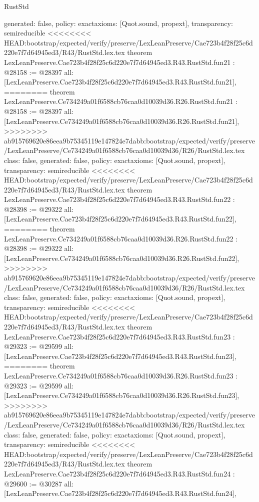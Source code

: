 \begin{lexlean}{RustStd}
\begin{coremodule}
{\begin{coremodule}
{{{{{{{{{{{{{{{{{{{{{{{{  generated: false,
  policy: exact{axioms: [Quot.sound, propext]},
  transparency: semireducible
}
<<<<<<<< HEAD:bootstrap/expected/verify/preserve/LexLeanPreserve/Cae723b4f28f25c6d220e7f7d64945ed3/R43/RustStd.lex.tex
theorem LexLeanPreserve.Cae723b4f28f25c6d220e7f7d64945ed3.R43.RustStd.fun21 : @28158 := @28397 {
  all: [LexLeanPreserve.Cae723b4f28f25c6d220e7f7d64945ed3.R43.RustStd.fun21],
========
theorem LexLeanPreserve.Ce734249a01f6588cb76caa0d10039d36.R26.RustStd.fun21 : @28158 := @28397 {
  all: [LexLeanPreserve.Ce734249a01f6588cb76caa0d10039d36.R26.RustStd.fun21],
>>>>>>>> ab915769620e86eea9b75345119e147824e7dabb:bootstrap/expected/verify/preserve/LexLeanPreserve/Ce734249a01f6588cb76caa0d10039d36/R26/RustStd.lex.tex
  class: false,
  generated: false,
  policy: exact{axioms: [Quot.sound, propext]},
  transparency: semireducible
}
<<<<<<<< HEAD:bootstrap/expected/verify/preserve/LexLeanPreserve/Cae723b4f28f25c6d220e7f7d64945ed3/R43/RustStd.lex.tex
theorem LexLeanPreserve.Cae723b4f28f25c6d220e7f7d64945ed3.R43.RustStd.fun22 : @28398 := @29322 {
  all: [LexLeanPreserve.Cae723b4f28f25c6d220e7f7d64945ed3.R43.RustStd.fun22],
========
theorem LexLeanPreserve.Ce734249a01f6588cb76caa0d10039d36.R26.RustStd.fun22 : @28398 := @29322 {
  all: [LexLeanPreserve.Ce734249a01f6588cb76caa0d10039d36.R26.RustStd.fun22],
>>>>>>>> ab915769620e86eea9b75345119e147824e7dabb:bootstrap/expected/verify/preserve/LexLeanPreserve/Ce734249a01f6588cb76caa0d10039d36/R26/RustStd.lex.tex
  class: false,
  generated: false,
  policy: exact{axioms: [Quot.sound, propext]},
  transparency: semireducible
}
<<<<<<<< HEAD:bootstrap/expected/verify/preserve/LexLeanPreserve/Cae723b4f28f25c6d220e7f7d64945ed3/R43/RustStd.lex.tex
theorem LexLeanPreserve.Cae723b4f28f25c6d220e7f7d64945ed3.R43.RustStd.fun23 : @29323 := @29599 {
  all: [LexLeanPreserve.Cae723b4f28f25c6d220e7f7d64945ed3.R43.RustStd.fun23],
========
theorem LexLeanPreserve.Ce734249a01f6588cb76caa0d10039d36.R26.RustStd.fun23 : @29323 := @29599 {
  all: [LexLeanPreserve.Ce734249a01f6588cb76caa0d10039d36.R26.RustStd.fun23],
>>>>>>>> ab915769620e86eea9b75345119e147824e7dabb:bootstrap/expected/verify/preserve/LexLeanPreserve/Ce734249a01f6588cb76caa0d10039d36/R26/RustStd.lex.tex
  class: false,
  generated: false,
  policy: exact{axioms: [Quot.sound, propext]},
  transparency: semireducible
}
<<<<<<<< HEAD:bootstrap/expected/verify/preserve/LexLeanPreserve/Cae723b4f28f25c6d220e7f7d64945ed3/R43/RustStd.lex.tex
theorem LexLeanPreserve.Cae723b4f28f25c6d220e7f7d64945ed3.R43.RustStd.fun24 : @29600 := @30287 {
  all: [LexLeanPreserve.Cae723b4f28f25c6d220e7f7d64945ed3.R43.RustStd.fun24],
}}}}}}}}}}}}}}}}}}}}}}}}}}}
\end{coremodule}}
\end{coremodule}
\end{lexlean}
